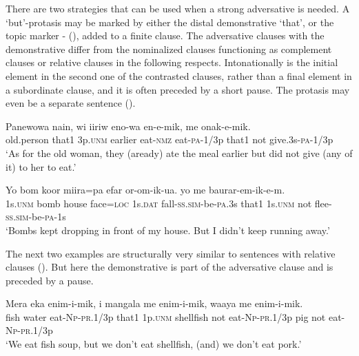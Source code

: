 There are two strategies that can be used when a strong adversative is needed. A `but'-protasis \citep[237]{Reesink1983b} may be marked by either the distal demonstrative  `that', or the topic marker - (), added to a finite clause. The adversative clauses with the demonstrative  differ from the nominalized clauses functioning as complement clauses or relative clauses in the following respects. Intonationally  is the initial element in the second one of the contrasted clauses, rather than a final element in a subordinate clause, and it is often preceded by a short pause. The protasis may even be a separate sentence (). 

\ea%
\label{ex:x1395}
\gll Panewowa  nain,  wi  iiriw  eno-wa  en-e-mik,    me onak-e-mik.\\
old.person  that1  3p.\textsc{unm}  earlier  eat-\textsc{nmz}  eat-\textsc{pa}-1/3p  that1  not give.3s-\textsc{pa}-1/3p\\
\glt`As for the old woman, they (aready) ate the meal earlier but did not give (any of it) to her to eat.'
\z


\ea%
\label{ex:x728}
\gll Yo  bom  koor  miira=pa  efar  or-om-ik-ua.   yo  me  baurar-em-ik-e-m. \\
1s.\textsc{unm}  bomb  house  face=\textsc{loc}  1s.\textsc{dat}  fall-\textsc{ss}.\textsc{sim}-be-\textsc{pa}.3s that1  1s.\textsc{unm}  not flee-\textsc{ss}.\textsc{sim}-be-\textsc{pa}-1s     \\
\glt`Bombs kept dropping in front of my house. But I didn't keep running away.'
\z


The next two examples are structurally very similar to sentences with relative clauses (). But here the demonstrative  is part of the adversative clause and is preceded by a pause. 

\ea%
\label{ex:x1389}
\gll Mera  eka  enim-i-mik,    i  mangala me  enim-i-mik,  waaya  me  enim-i-mik.\\
fish  water  eat-\textsc{Np}-\textsc{pr}.1/3p  that1  1p.\textsc{unm}  shellfish not  eat-\textsc{Np}-\textsc{pr}.1/3p  pig  not  eat-\textsc{Np}-\textsc{pr}.1/3p\\
\glt`We eat fish soup, but we don't eat shellfish, (and) we don't eat pork.'
\z


